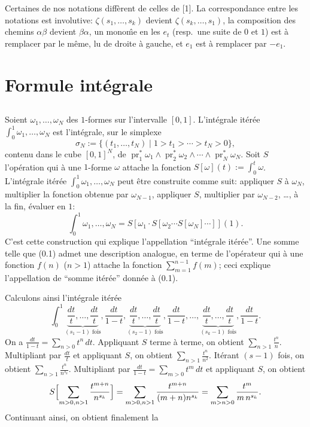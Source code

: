 \documentclass[11pt,a4paper]{article}
\theoremstyle{plain}
\theoremstyle{definition}
\DeclareMathOperator{\pr}{pr}
\begin{document}
Certaines de nos notations diff\`erent de celles de [1]. La correspondance entre les notations est involutive: $\zeta(s_1,\ldots,s_k)$ devient $\zeta(s_k,\ldots,s_1)$, la composition des chemins $\alpha\beta$ devient $\beta\alpha$, un mono\^me en les $e_t$ (resp.~une suite de $0$ et $1$) est \`a remplacer par le m\^eme, lu de droite \`a gauche, et $e_1$ est \`a remplacer par $-e_1$.

\section{Formule int\'egrale}\label{sec:1}

\subsection{}\label{ssec:1.1}

Soient $\omega_1,\ldots,\omega_N$ des $1$-formes sur l'intervalle $[0,1]$. L'int\'egrale it\'er\'ee $\int_0^1 \omega_1,\ldots,\omega_N$ est l'int\'egrale, sur le simplexe
\begin{equation}\label{eq:1.1.1}
\sigma_N := \{(t_1,\ldots,t_N) \mid 1 > t_1 > \cdots > t_N > 0\},
\end{equation}
contenu dans le cube $[0,1]^N$, de $\pr_1^*\omega_1 \wedge \pr_2^*\omega_2 \wedge \cdots \wedge \pr_N^*\omega_N$. Soit $S$ l'op\'eration qui \`a une $1$-forme $\omega$ attache la fonction $S[\omega](t) := \int_0^t \omega$. L'int\'egrale it\'er\'ee $\int_0^1 \omega_1,\ldots,\omega_N$ peut \^etre construite comme suit: appliquer $S$ \`a $\omega_N$, multiplier la fonction obtenue par $\omega_{N-1}$, appliquer $S$, multiplier par $\omega_{N-2}$, \ldots, \`a la fin, \'evaluer en $1$:
\begin{equation}\label{eq:1.1.2}
\int_0^1 \omega_1,\ldots,\omega_N = S[\omega_1 \cdot S[\omega_2 \cdots S[\omega_N]\cdots]](1).
\end{equation}
C'est cette construction qui explique l'appellation ``int\'egrale it\'er\'ee''. Une somme telle que (0.1) admet une description analogue, en terme de l'op\'erateur qui \`a une fonction $f(n)$ ($n > 1$) attache la fonction $\sum_{m=1}^{n-1} f(m)$; ceci explique l'appellation de ``somme it\'er\'ee'' donn\'ee \`a (0.1).

Calculons ainsi l'int\'egrale it\'er\'ee
\begin{equation}\label{eq:1.1.3}
\int_0^1 \underbrace{\frac{dt}{t},\ldots,\frac{dt}{t}}_{(s_1-1)\text{ fois}}, \frac{dt}{1-t}, \underbrace{\frac{dt}{t},\ldots,\frac{dt}{t}}_{(s_2-1)\text{ fois}}, \frac{dt}{1-t}, \ldots, \underbrace{\frac{dt}{t},\ldots,\frac{dt}{t}}_{(s_k-1)\text{ fois}}, \frac{dt}{1-t}.
\end{equation}
On a $\frac{dt}{1-t} = \sum_{n>0} t^n\,dt$. Appliquant $S$ terme \`a terme, on obtient $\sum_{n>1} \frac{t^n}{n}$. Multipliant par $\frac{dt}{t}$ et appliquant $S$, on obtient $\sum_{n>1} \frac{t^n}{n^2}$. It\'erant $(s-1)$ fois, on obtient $\sum_{n>1} \frac{t^n}{n^{s_k}}$. Multipliant par $\frac{dt}{1-t} = \sum_{m>0} t^m\,dt$ et appliquant $S$, on obtient
\[
S\Bigl[\sum_{m>0,n>1} \frac{t^{m+n}}{n^{s_k}}\Bigr] = \sum_{m>0,n>1} \frac{t^{m+n}}{(m+n)n^{s_k}} = \sum_{m>n>0} \frac{t^m}{m\,n^{s_k}}.
\]
Continuant ainsi, on obtient finalement la
\end{document}
